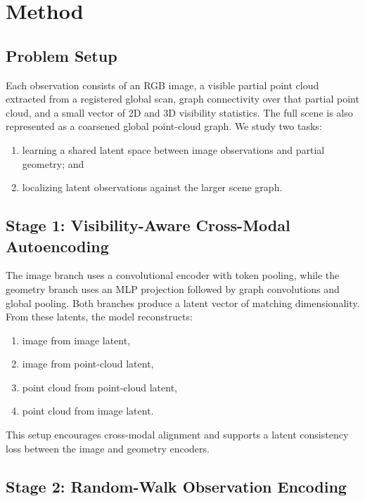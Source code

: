 \section{Method}

\subsection{Problem Setup}

Each observation consists of an RGB image, a visible partial point cloud extracted from a registered global scan, graph connectivity over that partial point cloud, and a small vector of 2D and 3D visibility statistics. The full scene is also represented as a coarsened global point-cloud graph. We study two tasks:
\begin{enumerate}[leftmargin=*]
  \item learning a shared latent space between image observations and partial geometry; and
  \item localizing latent observations against the larger scene graph.
\end{enumerate}

\subsection{Stage 1: Visibility-Aware Cross-Modal Autoencoding}

The image branch uses a convolutional encoder with token pooling, while the geometry branch uses an MLP projection followed by graph convolutions and global pooling. Both branches produce a latent vector of matching dimensionality. From these latents, the model reconstructs:
\begin{enumerate}[leftmargin=*]
  \item image from image latent,
  \item image from point-cloud latent,
  \item point cloud from point-cloud latent,
  \item point cloud from image latent.
\end{enumerate}

This setup encourages cross-modal alignment and supports a latent consistency loss between the image and geometry encoders.

\subsection{Stage 2: Random-Walk Observation Encoding}

